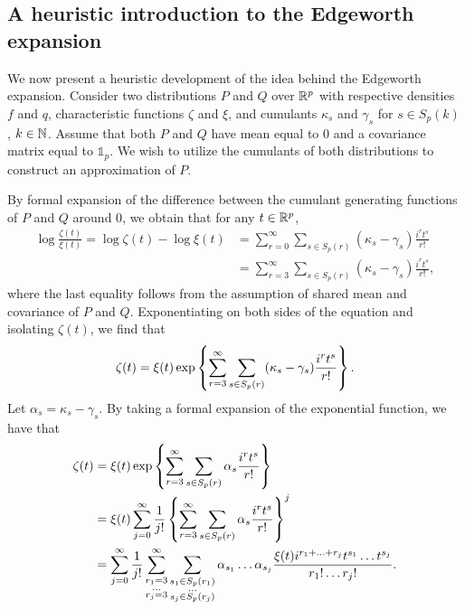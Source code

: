 \subsection{A heuristic introduction to the Edgeworth expansion} \label{sec-edgeworth}

We now present a heuristic development of the idea behind the Edgeworth expansion. Consider two distributions $P$ and $Q$ over ${\mathbb{R}^p}$ with respective densities $f$ and $q$, characteristic functions $\zeta$ and $\xi$, and cumulants $\kappa_s$ and $\gamma_s$ for $s \in S_p(k)$, $k \in \mathbb{N}$. Assume that both $P$ and $Q$ have mean equal to $0$ and a covariance matrix equal to $\mathbb{1}_p$. We wish to utilize the cumulants of both distributions to construct an approximation of $P$.

By formal expansion of the difference between the cumulant generating functions of $P$ and $Q$ around 0, we obtain that for any $t \in {\mathbb{R}^p}$,
\begin{align*}
    \log \frac{\zeta(t)}{\xi(t)}
    = \log \zeta(t) - \log \xi(t) 
    &= \sum_{r=0}^\infty \sum_{s \in S_p(r)} (\kappa_s - \gamma_s)\frac{i^r t^s}{r!}\\
    &= \sum_{r=3}^\infty \sum_{s \in S_p(r)} (\kappa_s - \gamma_s)\frac{i^r t^s}{r!},
\end{align*}
where the last equality follows from the assumption of shared mean and covariance of $P$ and $Q$. Exponentiating on both sides of the equation and isolating $\zeta(t)$, we find that
\begin{equation*}
    \zeta(t) = \xi(t)\exp\left\{\sum_{r=3}^\infty \sum_{s \in S_p(r)} (\kappa_s - \gamma_s)\frac{i^r t^s}{r!}\right\}.
\end{equation*}
Let $\alpha_s = \kappa_s - \gamma_s$. By taking a formal expansion of the exponential function, we have that
\begin{align*}
    \zeta(t)
    &= \xi(t)\exp\left\{\sum_{r=3}^\infty \sum_{s \in S_p(r)} \alpha_s\frac{i^r t^s}{r!}\right\}\\
    &= \xi(t)\sum_{j=0}^\infty \frac{1}{j!} \left\{\sum_{r=3}^\infty \sum_{s \in S_p(r)} \alpha_s\frac{i^r t^s}{r!}\right\}^j \\
    &=
    \sum_{j=0}^\infty \frac{1}{j!} 
    \sum_{\substack{r_1 = 3\\ \ldots \\r_j = 3}}^\infty
    \sum_{\substack{s_1 \in S_p(r_1)\\ \ldots \\s_j \in S_p(r_j)}}
    \alpha_{s_1}\ldots\alpha_{s_j}
    \frac{
        \xi(t) i^{r_1 + \ldots + r_j}
        t^{s_1} \ldots t^{s_j}
    }{
        r_1! \ldots r_j!
    }.
\end{align*}
